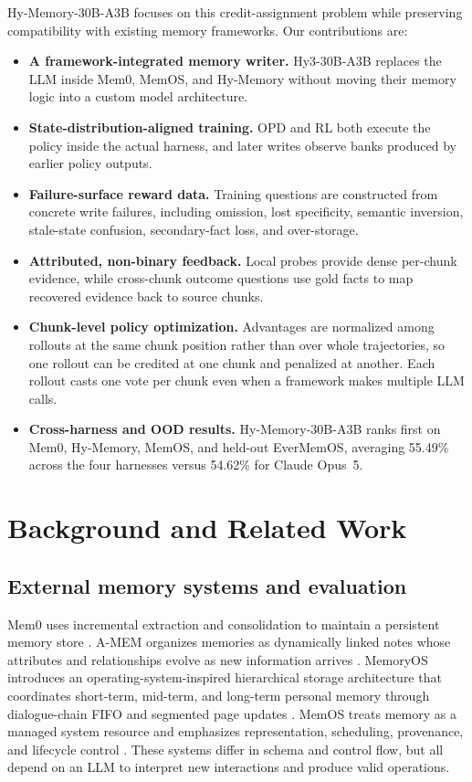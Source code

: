 \documentclass{article}
\begin{document}
Hy-Memory-30B-A3B focuses on this credit-assignment problem while preserving compatibility with existing memory frameworks. Our contributions are:
\begin{itemize}
\item \textbf{A framework-integrated memory writer.} Hy3-30B-A3B replaces the LLM inside Mem0, MemOS, and Hy-Memory without moving their memory logic into a custom model architecture.
\item \textbf{State-distribution-aligned training.} OPD and RL both execute the policy inside the actual harness, and later writes observe banks produced by earlier policy outputs.
\item \textbf{Failure-surface reward data.} Training questions are constructed from concrete write failures, including omission, lost specificity, semantic inversion, stale-state confusion, secondary-fact loss, and over-storage.
\item \textbf{Attributed, non-binary feedback.} Local probes provide dense per-chunk evidence, while cross-chunk outcome questions use gold facts to map recovered evidence back to source chunks.
\item \textbf{Chunk-level policy optimization.} Advantages are normalized among rollouts at the same chunk position rather than over whole trajectories, so one rollout can be credited at one chunk and penalized at another. Each rollout casts one vote per chunk even when a framework makes multiple LLM calls.
\item \textbf{Cross-harness and OOD results.} Hy-Memory-30B-A3B ranks first on Mem0, Hy-Memory, MemOS, and held-out EverMemOS, averaging 55.49\% across the four harnesses versus 54.62\% for Claude Opus~5.
\end{itemize}

\section{Background and Related Work}

\subsection{External memory systems and evaluation}

Mem0 uses incremental extraction and consolidation to maintain a persistent memory store \citep{mem0}. A-MEM organizes memories as dynamically linked notes whose attributes and relationships evolve as new information arrives \citep{amem}. MemoryOS introduces an operating-system-inspired hierarchical storage architecture that coordinates short-term, mid-term, and long-term personal memory through dialogue-chain FIFO and segmented page updates \citep{memoryos}. MemOS treats memory as a managed system resource and emphasizes representation, scheduling, provenance, and lifecycle control \citep{memos}. These systems differ in schema and control flow, but all depend on an LLM to interpret new interactions and produce valid operations.
\end{document}
